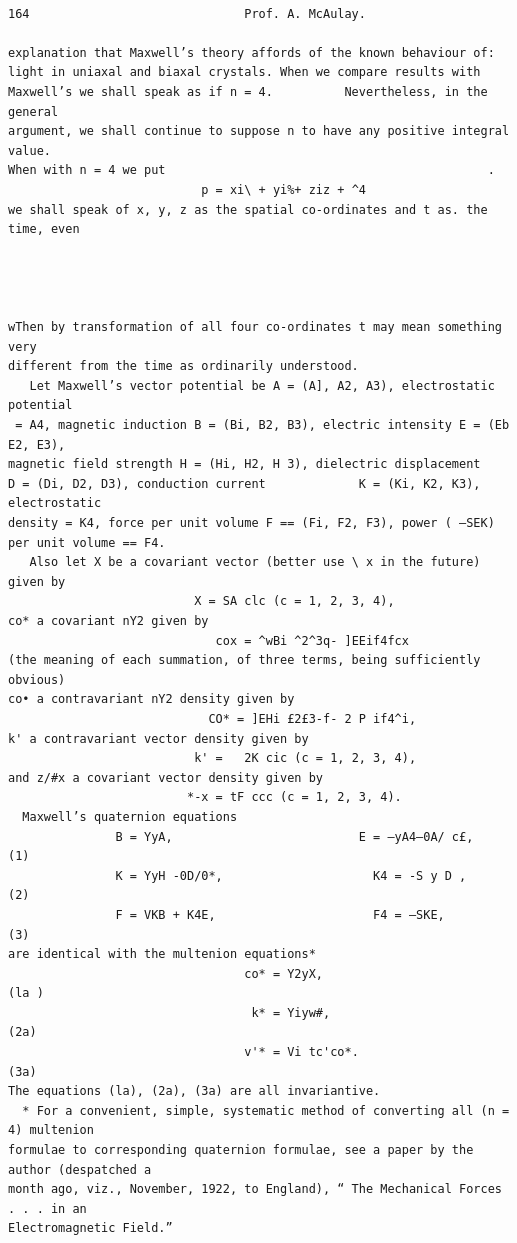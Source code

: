 \documentclass[10pt]{article}
\begin{document}
\clearpage
\begin{verbatim}

164                              Prof. A. McAulay.

explanation that Maxwell’s theory affords of the known behaviour of:
light in uniaxal and biaxal crystals. When we compare results with
Maxwell’s we shall speak as if n = 4.          Nevertheless, in the general
argument, we shall continue to suppose n to have any positive integral value.
When with n = 4 we put                                             .
                           p = xi\ + yi%+ ziz + ^4
we shall speak of x, y, z as the spatial co-ordinates and t as. the time, even




wThen by transformation of all four co-ordinates t may mean something very
different from the time as ordinarily understood.
   Let Maxwell’s vector potential be A = (A], A2, A3), electrostatic potential
 = A4, magnetic induction B = (Bi, B2, B3), electric intensity E = (Eb E2, E3),
magnetic field strength H = (Hi, H2, H 3), dielectric displacement
D = (Di, D2, D3), conduction current             K = (Ki, K2, K3), electrostatic
density = K4, force per unit volume F == (Fi, F2, F3), power ( —SEK)
per unit volume == F4.
   Also let X be a covariant vector (better use \ x in the future) given by
                          X = SA clc (c = 1, 2, 3, 4),
co* a covariant nY2 given by
                             cox = ^wBi ^2^3q- ]EEif4fcx
(the meaning of each summation, of three terms, being sufficiently obvious)
co• a contravariant nY2 density given by
                            CO* = ]EHi £2£3-f- 2 P if4^i,
k' a contravariant vector density given by
                          k' =   2K cic (c = 1, 2, 3, 4),
and z/#x a covariant vector density given by
                         *-x = tF ccc (c = 1, 2, 3, 4).
  Maxwell’s quaternion equations
               B = YyA,                          E = —yA4—0A/ c£,                  (1)
               K = YyH -0D/0*,                     K4 = -S y D ,                   (2)
               F = VKB + K4E,                      F4 = —SKE,                      (3)
are identical with the multenion equations*
                                 co* = Y2yX,                                     (la )
                                  k* = Yiyw#,                                    (2a)
                                 v'* = Vi tc'co*.                                (3a)
The equations (la), (2a), (3a) are all invariantive.
  * For a convenient, simple, systematic method of converting all (n = 4) multenion
formulae to corresponding quaternion formulae, see a paper by the author (despatched a
month ago, viz., November, 1922, to England), “ The Mechanical Forces . . . in an
Electromagnetic Field.”


\end{verbatim}
\end{document}

